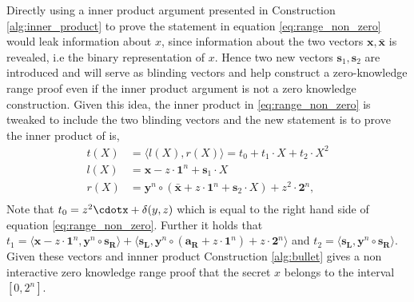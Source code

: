 Directly using  a inner product argument presented in Construction \ref{alg:inner_product} to prove the statement  in equation \eqref{eq:range_non_zero} would leak information about $x$, since information about the two vectors $\bm{x},\bm{\bar{x}}$ is revealed, i.e the binary representation of $x$. Hence two new vectors $\bm{s}_1,\bm{s}_2$ are introduced and will serve as blinding vectors and help construct a zero-knowledge range proof even if the inner product argument is not a zero knowledge construction. Given this idea, the inner product in \eqref{eq:range_non_zero} is tweaked to include the two blinding vectors and the new statement is to prove the inner product of is,
\begin{align*}
     t(X) &= \langle  l(X),r(X)\rangle = t_0 + t_1\cdot X + t_2\cdot X^2\\
    l(X) &= \bm{x} -z\cdot \bm{1}^n +\bm{s}_1\cdot X\\
    r(X) &= \bm{y}^n\circ (\bm{\bar{x}} + z \cdot\bm{1}^n + \bm{s}_2\cdot X)+ z^2\cdot\bm{2}^n,\\
\end{align*}
Note that $t_0 = z^2\cdotx + \delta(y,z)$ which is equal to the right hand side of equation \eqref{eq:range_non_zero}. Further it holds that $t_1 = \langle \bm{x}-z\cdot \bm{1}^n , \bm{y}^n\circ \bm{s_R}\rangle + \langle\bm{s_L},\bm{y}^n\circ (\bm{a_R}+z\cdot\bm{1}^n) + z\cdot \bm{2}^n\rangle$ and $t_2 =\langle \bm{s_L}, \bm{y}^n \circ \bm{s_R}\rangle $. Given these vectors and innner product Construction \ref{alg:bullet} gives a non interactive zero knowledge range proof that the secret $x$ belongs to the interval $[0,2^n]$.


